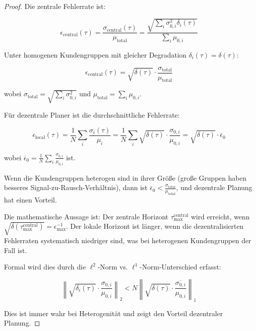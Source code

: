 \documentclass[a4paper, 12pt, twoside, openright]{report}
\theoremstyle{definition}
\theoremstyle{definition}
\begin{document}
\begin{proof}
Die zentrale Fehlerrate ist:

\begin{equation}
\epsilon_{\text{central}}(\tau) = \frac{\sigma_{\text{central}}(\tau)}{\mu_{\text{total}}} = \frac{\sqrt{\sum_i \sigma_{0,i}^2 \delta_i(\tau)}}{\sum_i \mu_{0,i}}
\end{equation}

Unter homogenen Kundengruppen mit gleicher Degradation $\delta_i(\tau) = \delta(\tau)$:

\begin{equation}
\epsilon_{\text{central}}(\tau) = \sqrt{\delta(\tau)} \cdot \frac{\sigma_{\text{total}}}{\mu_{\text{total}}}
\end{equation}

wobei $\sigma_{\text{total}} = \sqrt{\sum_i \sigma_{0,i}^2}$ und $\mu_{\text{total}} = \sum_i \mu_{0,i}$.

Für dezentrale Planer ist die durchschnittliche Fehlerrate:

\begin{equation}
\epsilon_{\text{local}}(\tau) = \frac{1}{N} \sum_i \frac{\sigma_i(\tau)}{\mu_i} = \frac{1}{N} \sum_i \sqrt{\delta(\tau)} \cdot \frac{\sigma_{0,i}}{\mu_{0,i}} = \sqrt{\delta(\tau)} \cdot \overline{\epsilon}_0
\end{equation}

wobei $\overline{\epsilon}_0 = \frac{1}{N}\sum_i \frac{\sigma_{0,i}}{\mu_{0,i}}$ ist.

Wenn die Kundengruppen heterogen sind in ihrer Größe (große Gruppen haben besseres Signal-zu-Rausch-Verhältnis), dann ist $\overline{\epsilon}_0 < \frac{\sigma_{\text{total}}}{\mu_{\text{total}}}$, und dezentrale Planung hat einen Vorteil.

Die mathematische Aussage ist: Der zentrale Horizont $\tau_{\max}^{\text{central}}$ wird erreicht, wenn $\sqrt{\delta(\tau_{\max}^{\text{central}})} = \epsilon_{\max}^{-1}$. Der lokale Horizont ist länger, wenn die dezentralisierten Fehlerraten systematisch niedriger sind, was bei heterogenen Kundengruppen der Fall ist.

Formal wird dies durch die $\ell^2$-Norm vs. $\ell^1$-Norm-Unterschied erfasst:

\begin{equation}
\left\| \sqrt{\delta_i(\tau)} \cdot \frac{\sigma_{0,i}}{\mu_{0,i}} \right\|_2 < N \left\| \sqrt{\delta(\tau)} \cdot \overline{\frac{\sigma_{0,i}}{\mu_{0,i}}} \right\|_1
\end{equation}

Dies ist immer wahr bei Heterogenität und zeigt den Vorteil dezentraler Planung.
\end{proof}
\end{document}
